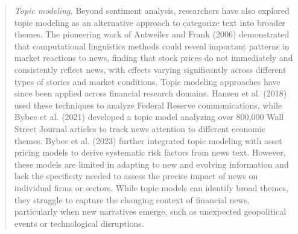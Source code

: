 \begin{quote}
\hspace{0.5cm} \textit{Topic modeling.} 
Beyond sentiment analysis, researchers have also explored topic modeling as an alternative approach to categorize text into broader themes. The pioneering work of Antweiler and Frank (2006) demonstrated that computational linguistics methods could reveal important patterns in market reactions to news, finding that stock prices do not immediately and consistently reflect news, with effects varying significantly across different types of stories and market conditions. Topic modeling approaches have since been applied across financial research domains. Hansen et al. (2018) used these techniques to analyze Federal Reserve communications, while Bybee et al. (2021) developed a topic model analyzing over 800,000 Wall Street Journal articles to track news attention to different economic themes. Bybee et al. (2023) further integrated topic modeling with asset pricing models to derive systematic risk factors from news text.
%
However, these models are limited in adapting to new and evolving information and lack the specificity needed to assess the precise impact of news on individual firms or sectors. While topic models can identify broad themes, they struggle to capture the changing context of financial news, particularly when new narratives emerge, such as unexpected geopolitical events or technological disruptions.



\end{quote}
